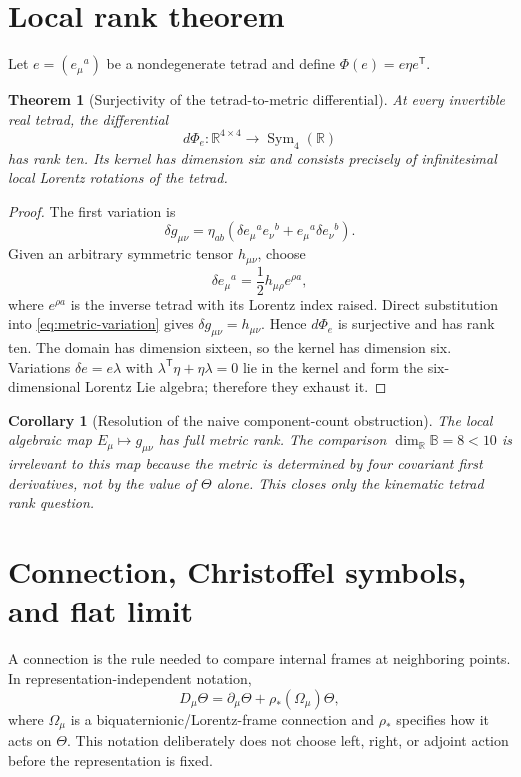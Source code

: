 \documentclass[12pt]{article}
\newtheorem{theorem}[definition]{Theorem}
\newtheorem{corollary}[definition]{Corollary}
\theoremstyle{remark}\newtheorem{remark}[definition]{Remark}
\begin{document}
\section{Local rank theorem}
Let $e=(e_\mu{}^a)$ be a nondegenerate tetrad and define
$\Phi(e)=e\eta e^{\mathsf T}$.

\begin{theorem}[Surjectivity of the tetrad-to-metric differential]
At every invertible real tetrad, the differential
\[
 d\Phi_e:\mathbb R^{4\times4}\longrightarrow\operatorname{Sym}_4(\mathbb R)
\]
has rank ten.  Its kernel has dimension six and consists precisely of
infinitesimal local Lorentz rotations of the tetrad.
\end{theorem}

\begin{proof}
The first variation is
\begin{equation}
 \delta g_{\mu\nu}=\eta_{ab}
 \left(\delta e_\mu{}^a e_\nu{}^b+e_\mu{}^a\delta e_\nu{}^b\right).
 \label{eq:metric-variation}
\end{equation}
Given an arbitrary symmetric tensor $h_{\mu\nu}$, choose
\begin{equation}
 \delta e_\mu{}^a=\frac12 h_{\mu\rho}e^{\rho a},
 \label{eq:surjective-choice}
\end{equation}
where $e^{\rho a}$ is the inverse tetrad with its Lorentz index raised.  Direct
substitution into \eqref{eq:metric-variation} gives
$\delta g_{\mu\nu}=h_{\mu\nu}$.  Hence $d\Phi_e$ is surjective and has rank ten.
The domain has dimension sixteen, so the kernel has dimension six.  Variations
$\delta e=e\lambda$ with $\lambda^{\mathsf T}\eta+\eta\lambda=0$ lie in the
kernel and form the six-dimensional Lorentz Lie algebra; therefore they exhaust
it.
\end{proof}

\begin{corollary}[Resolution of the naive component-count obstruction]
The local algebraic map $E_\mu\mapsto g_{\mu\nu}$ has full metric rank.  The
comparison $\dim_\mathbb R\mathbb B=8<10$ is irrelevant to this map because the
metric is determined by four covariant first derivatives, not by the value of
$\Theta$ alone.  This closes only the \emph{kinematic tetrad rank} question.
\end{corollary}

\section{Connection, Christoffel symbols, and flat limit}
A connection is the rule needed to compare internal frames at neighboring
points.  In representation-independent notation,
\begin{equation}
 D_\mu\Theta=\partial_\mu\Theta+\rho_*(\Omega_\mu)\Theta,
 \label{eq:D-general}
\end{equation}
where $\Omega_\mu$ is a biquaternionic/Lorentz-frame connection and $\rho_*$
specifies how it acts on $\Theta$.  This notation deliberately does not choose
left, right, or adjoint action before the representation is fixed.
\end{document}
